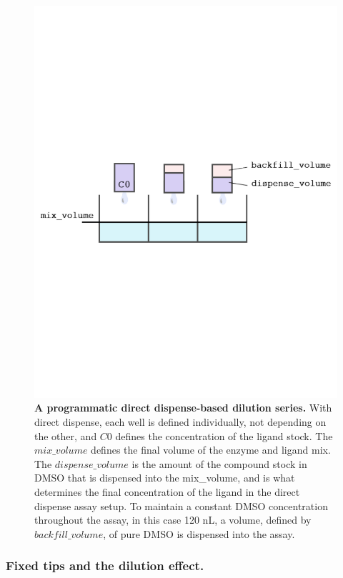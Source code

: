 \documentclass[aps,pre,twocolumn,nofootinbib,superscriptaddress,linenumbers]{revtex4-1}
\begin{document}
\begin{figure}[tb]
    \includegraphics[trim={0 9cm 0 9cm},clip,width=\columnwidth]{../figures/direct_dispense.pdf}

  \caption{{\bf A programmatic direct dispense-based dilution series.}
  With direct dispense, each well is defined individually, not depending on the other, and $C0$ defines the concentration of the ligand stock. The $mix\_volume$ defines the final volume of the enzyme and ligand mix. 
  The $dispense\_volume$ is the amount of the compound stock in DMSO that is dispensed into the mix\_volume, and is what determines the final concentration of the ligand in the direct dispense assay setup. 
  To maintain a constant DMSO concentration throughout the assay, in this case 120 nL, a volume, defined by $backfill\_volume$, of pure DMSO is dispensed into the assay.
  }
  \label{fig:direct_dispense}
\end{figure}

\subsubsection*{Fixed tips and the dilution effect.}
\end{document}
